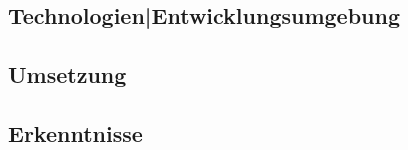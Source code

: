 \begin{spacing}{1}
\chapter{Technologien|Entwicklungsumgebung}
\end{spacing}

\newpage

\begin{spacing}{1}
\chapter{Umsetzung}
\end{spacing}

\newpage

\begin{spacing}{1}
\chapter{Erkenntnisse}
\end{spacing}


\setcounter{page}{\value{RPages}}

\glsnogroupskiptrue
\printglossary[title=Glossar,toctitle=Glossar] %
\listoffigures
\lstlistoflistings
\appendix


